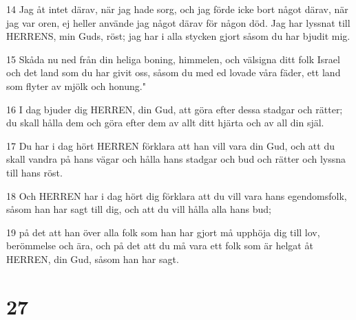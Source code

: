 \par 14 Jag åt intet därav, när jag hade sorg, och jag förde icke bort något därav, när jag var oren, ej heller använde jag något därav för någon död. Jag har lyssnat till HERRENS, min Guds, röst; jag har i alla stycken gjort såsom du har bjudit mig.
\par 15 Skåda nu ned från din heliga boning, himmelen, och välsigna ditt folk Israel och det land som du har givit oss, såsom du med ed lovade våra fäder, ett land som flyter av mjölk och honung."
\par 16 I dag bjuder dig HERREN, din Gud, att göra efter dessa stadgar och rätter; du skall hålla dem och göra efter dem av allt ditt hjärta och av all din själ.
\par 17 Du har i dag hört HERREN förklara att han vill vara din Gud, och att du skall vandra på hans vägar och hålla hans stadgar och bud och rätter och lyssna till hans röst.
\par 18 Och HERREN har i dag hört dig förklara att du vill vara hans egendomsfolk, såsom han har sagt till dig, och att du vill hålla alla hans bud;
\par 19 på det att han över alla folk som han har gjort må upphöja dig till lov, berömmelse och ära, och på det att du må vara ett folk som är helgat åt HERREN, din Gud, såsom han har sagt.

\chapter{27}

